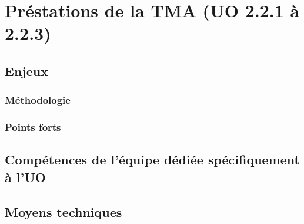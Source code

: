 	\section{Préstations de la TMA (UO 2.2.1 à 2.2.3)}
	\subsection{Enjeux}
	\subsubsection{Méthodologie}
	\subsubsection{Points forts}
	\subsection{Compétences de l'équipe dédiée spécifiquement à l'UO}	
	\subsection{Moyens techniques}